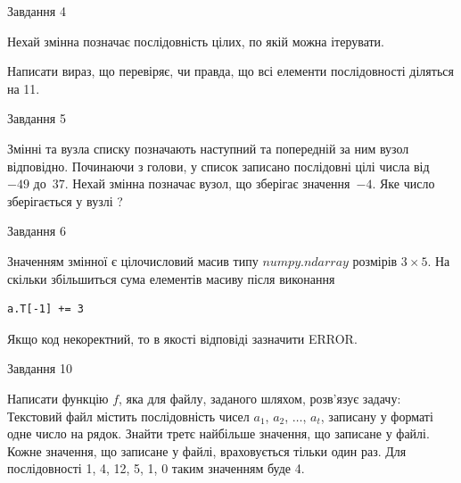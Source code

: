 \documentclass[12pt, ukrainian]{article}
\begin{document}
{\begin{minipage}[t]{8.0cm}
\end{minipage}


               
{\begin{center}Завдання {4}\end{center}}
\vspace{-4mm}
Нехай змінна  позначає послідовність цілих, по якій можна ітерувати.

Написати вираз, що перевіряє, чи правда, що всі елементи послідовності діляться на 11.\par

\vspace{10mm}
               
{\begin{center}Завдання {5}\end{center}}
\vspace{-4mm}
Змінні  та  вузла списку позначають наступний та попередній за ним вузол відповідно. Починаючи з голови, у список записано послідовні цілі числа від~$-49$ до~$37$. Нехай змінна  позначає вузол, що зберігає значення~$-4$.
Яке число зберігається у вузлі  ?\par

               
{\begin{center}Завдання {6}\end{center}}
\vspace{-4mm}
Значенням змінної  є цілочисловий масив типу $numpy.ndarray$ розмірів $3{\times}5$. На скільки збільшиться сума елементів масиву  після виконання
\begin{verbatim}
a.T[-1] += 3
\end{verbatim}


Якщо код некоректний, то в якості відповіді зазначити ERROR.\par

               
{\begin{center}Завдання {10}\end{center}}
\vspace{-4mm}

Написати функцію $f$, яка для файлу, заданого шляхом, розв’язує задачу:\\ Текстовий файл містить послідовність чисел $a_1$, $a_2$, $\ldots$, $a_t$, записану у форматі одне число на рядок. Знайти третє найбільше значення, що записане у файлі. Кожне значення, що записане у файлі, враховується тільки один раз. Для послідовності 1, 4, 12, 5, 1, 0 таким значенням буде 4.

}
\end{document}
